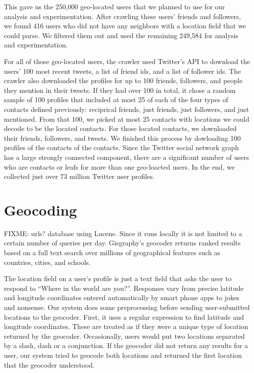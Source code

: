 This gave us the 250,000 geo-located users that we planned to use for our
analysis and experimentation.
After crawling these users' friends and followers, we found 416 users who did
not have any neighbors with a location field that we could parse.
We filtered them out and used the remaining 249,584 for analysis and
experimentation.

For all of those geo-located users, the crawler used Twitter's API to download
the users' 100 most recent tweets, a list of friend ids, and a list of follower ids.
The crawler also downloaded the profiles for up to 100 friends, followers, and
people they mention in their tweets.
%
If they had over 100 in total, it chose a random sample of 100 profiles that
included at most 25 of each of the four types of contacts defined previously:
reciprical friends, just friends, just followers, and just mentioned.
%
From that 100, we picked at most 25 contacts with locations we could decode to
be the located contacts. For those located contacts, we downloaded their
friends, followers, and tweets.
%
We finished this process by dowloading 100 profiles of the contacts of the
contacts.
%
Since the Twitter social network graph has a large strongly connected
component, there are a significant number of users who are contacts or leafs for
more than one geo-loacted users.
%
In the end, we collected just over 73 million Twitter user profiles.

\section{Geocoding}
FIXME: urls?
database using Lucene. Since
it runs locally it is not limited to a certain number of queries per day.
Gisgraphy's geocoder returns ranked results based on a full text search
over millions of geographical features such as countries, cities, and schools.

The location field on a user's profile is just a text field that asks the user
to respond to ``Where in the world are you?''.
Responses vary from precise latitude and longitude coordinates entered
automatically by smart phone apps to jokes and nonsense.
Our system does some preprocessing before sending user-submitted locations to
the geocoder.
First, it uses a regular expression to find latitude and longitude coordinates.
These are treated as if they were a unique type of location returned by the
geocoder.
Occasionally, users would put two locations separated by a slash, dash or a
conjunction.
If the geocoder did not return any results for a user, our system tried to
geocode both locations and returned the first location that the geocoder
understood.

